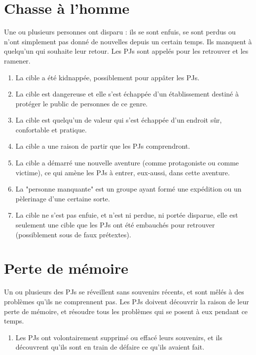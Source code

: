 \begin{multicols}{2}
\section{Chasse à l'homme}
\hypertarget{chasse}{}


Une ou plusieurs personnes ont disparu : ils se sont enfuis, se sont perdus ou n'ont simplement pas donné de nouvelles depuis un certain temps. Ils manquent à quelqu'un qui souhaite leur retour. Les PJs sont appelés pour les retrouver et les ramener.

\themes
\begin{enumerate}
\item La cible a été kidnappée, possiblement pour appâter les PJs.
\item La cible est dangereuse et elle s'est échappée d'un établissement destiné à protéger le public de personnes de ce genre.
\item La cible est quelqu'un de valeur qui s'est échappée d'un endroit sûr, confortable et pratique.
\item La cible a une raison de partir que les PJs comprendront.
\item La cible a démarré une nouvelle aventure (comme protagoniste ou comme victime), ce qui amène les PJs à entrer, eux-aussi, dans cette aventure.
\item La "personne manquante" est un groupe ayant formé une expédition ou un pèlerinage d'une certaine sorte.
\item La cible ne s'est pas enfuie, et n'est ni perdue, ni portée disparue, elle est seulement une cible que les PJs ont été embauchés pour retrouver (possiblement sous de faux prétextes).
\end{enumerate}

\section{Perte de mémoire}
\hypertarget{memoire}{}


Un ou plusieurs des PJs se réveillent sans souvenirs récents, et sont mêlés à des problèmes qu'ils ne comprennent pas. Les PJs doivent découvrir la raison de leur perte de mémoire, et résoudre tous les problèmes qui se posent à eux pendant ce temps.

\themes
\begin{enumerate}
\item Les PJs ont volontairement supprimé ou effacé leurs souvenirs, et ils découvrent qu'ils sont en train de défaire ce qu'ils avaient fait.
\end{enumerate}


\end{multicols}
